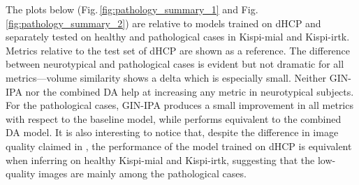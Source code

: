 The plots below (Fig.\,\ref{fig:pathology_summary_1} and Fig.\,\ref{fig:pathology_summary_2}) are relative to models trained on dHCP and separately tested on healthy and pathological cases in Kispi-mial and Kispi-irtk. Metrics relative to the test set of dHCP are shown as a reference. The difference between neurotypical and pathological cases is evident but not dramatic for all metrics---volume similarity shows a delta which is especially small. Neither GIN-IPA nor the combined DA help at increasing any metric in neurotypical subjects. For the pathological cases, GIN-IPA produces a small improvement in all metrics with respect to the baseline model, while performs equivalent to the combined DA model. It is also interesting to notice that, despite the difference in image quality claimed in \cite{FeTA2021_review}, the performance of the model trained on dHCP is equivalent when inferring on healthy Kispi-mial and Kispi-irtk, suggesting that the low-quality images are mainly among the pathological cases.

